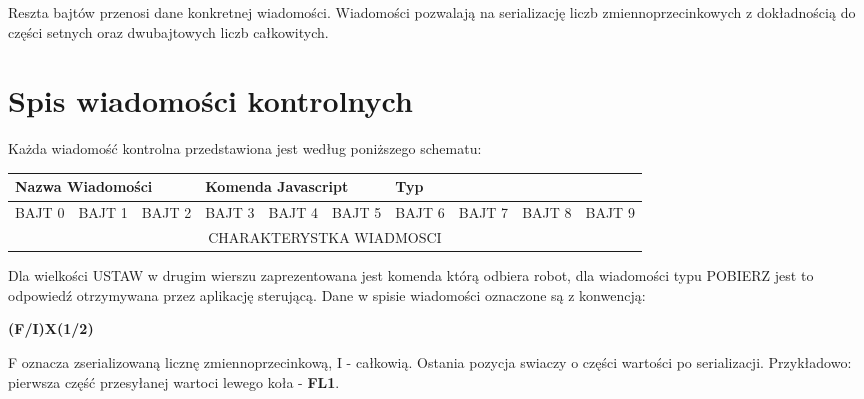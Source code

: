 \documentclass[eng,printmode]{mgr}
\begin{document}
Reszta bajtów przenosi dane konkretnej wiadomości. Wiadomości pozwalają na serializację liczb zmiennoprzecinkowych  z dokładnością do części setnych oraz dwubajtowych liczb całkowitych. 

 \section{Spis wiadomości kontrolnych}   

Każda wiadomość kontrolna przedstawiona jest według poniższego schematu:
\begin{table}[!htb]
\centering
\begin{adjustbox}{width=1\textwidth}
\label{my-label}
\begin{tabular}{|l|l|l|l|l|l|l|l|l|l|}
\hline
\multicolumn{3}{|l|}{Nazwa Wiadomości} & \multicolumn{3}{l|}{Komenda Javascript} & \multicolumn{2}{l|}{Typ} \\ \hline
BAJT 0      & BAJT 1      & BAJT 2     & BAJT 3      & BAJT 4      & BAJT 5      & BAJT 6      & BAJT 7     & BAJT 8     & BAJT 9     \\ \hline
\multicolumn{10}{|c|}{CHARAKTERYSTKA WIADMOSCI}                                                                                       \\ \hline
\end{tabular}
\end{adjustbox}
\end{table}

Dla wielkości USTAW w drugim wierszu zaprezentowana jest komenda którą odbiera robot, dla wiadomości typu POBIERZ jest to odpowiedź otrzymywana przez aplikację sterującą. Dane w spisie wiadomości oznaczone są z konwencją: 
\begin{center}
\textbf{(F/I)X(1/2)}
\end{center}
F oznacza zserializowaną licznę zmiennoprzecinkową, I - całkowią. Ostania pozycja swiaczy o części wartości po serializacji. Przykładowo: pierwsza część przesyłanej wartoci lewego koła -\textbf{ FL1}. 
\end{document}
